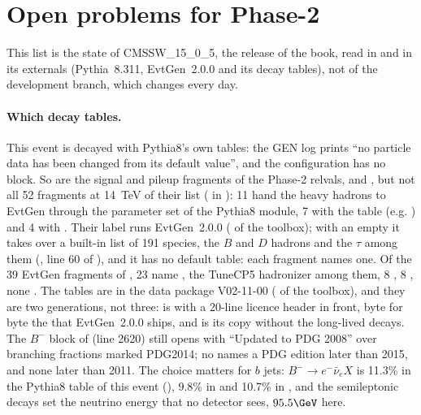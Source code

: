 \FloatBarrier
\section{Open problems for Phase-2}
This list is the state of CMSSW\_15\_0\_5, the release of the book, read in  and in its
externals (Pythia~8.311, EvtGen~2.0.0 and its decay tables), not of the development branch, which changes every day.

\paragraph{Which decay tables.}
This event is decayed with Pythia8's own tables: the GEN log prints ``no particle data has been changed from its
default value'', and the configuration has no  block. So are the signal and pileup fragments of
the Phase-2 relvals,  and
, but not all 52 fragments at 14~TeV of their list (
in ): 11 hand the heavy hadrons to EvtGen
through the  parameter set of the Pythia8 module, 7 with the table  (e.g.
) and 4 with . Their label  runs
EvtGen~2.0.0 ( of the toolbox); with an empty  it takes over a built-in
list of 191 species, the $B$ and $D$ hadrons and the $\tau$ among them (, line 60 of
), and it has no default table: each
fragment names one. Of the 39 EvtGen fragments of , 23 name
, the TuneCP5 hadronizer
 among them, 8
, 8 , none . The tables are in the
data package  V02-11-00 ( of the toolbox), and they are
two generations, not three:  is  with a 20-line licence header in front,
byte for byte the  that EvtGen~2.0.0 ships, and  is its copy without the
long-lived decays. The $B^-$ block of  (line 2620) still opens with ``Updated to PDG 2008'' over
branching fractions marked PDG2014; no  names a PDG edition later than 2015, and
 none later than 2011. The choice matters for $b$ jets: $B^-\to e^-\bar\nu_e X$ is 11.3\% in the
Pythia8 table of this event (), 9.8\% in  and 10.7\% in
, and the semileptonic decays set the neutrino energy that no detector sees, $95.5\GeV$ here.

